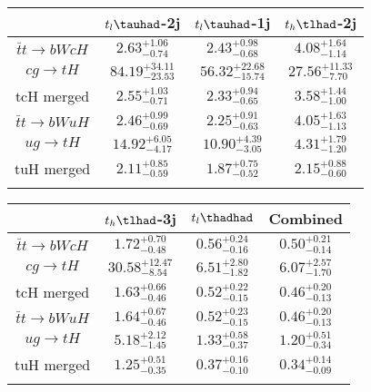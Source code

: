 \centering
\begin{tabular}{cccc} \toprule\toprule
 & $t_l\tauhad$-2j & $t_l\tauhad$-1j & $t_h\tlhad$-2j\\\midrule
$\bar{t}t\to bWcH$ & $2.63^{+1.06}_{-0.74}$ & $2.43^{+0.98}_{-0.68}$ & $4.08^{+1.64}_{-1.14}$\\
$cg\to tH$ & $84.19^{+34.11}_{-23.53}$ & $56.32^{+22.68}_{-15.74}$ & $27.56^{+11.33}_{-7.70}$\\
tcH merged & $2.55^{+1.03}_{-0.71}$ & $2.33^{+0.94}_{-0.65}$ & $3.58^{+1.44}_{-1.00}$\\
$\bar{t}t\to bWuH$ & $2.46^{+0.99}_{-0.69}$ & $2.25^{+0.91}_{-0.63}$ & $4.05^{+1.63}_{-1.13}$\\
$ug\to tH$ & $14.92^{+6.05}_{-4.17}$ & $10.90^{+4.39}_{-3.05}$ & $4.31^{+1.79}_{-1.20}$\\
tuH merged & $2.11^{+0.85}_{-0.59}$ & $1.87^{+0.75}_{-0.52}$ & $2.15^{+0.88}_{-0.60}$\\
\bottomrule\bottomrule\\
\end{tabular}
\begin{tabular}{cccc} \toprule\toprule
 & $t_h\tlhad$-3j & $t_l\thadhad$ & Combined\\\midrule
$\bar{t}t\to bWcH$ & $1.72^{+0.70}_{-0.48}$ & $0.56^{+0.24}_{-0.16}$ & $0.50^{+0.21}_{-0.14}$\\
$cg\to tH$ & $30.58^{+12.47}_{-8.54}$ & $6.51^{+2.80}_{-1.82}$ & $6.07^{+2.57}_{-1.70}$\\
tcH merged & $1.63^{+0.66}_{-0.46}$ & $0.52^{+0.22}_{-0.15}$ & $0.46^{+0.20}_{-0.13}$\\
$\bar{t}t\to bWuH$ & $1.64^{+0.67}_{-0.46}$ & $0.52^{+0.23}_{-0.15}$ & $0.46^{+0.20}_{-0.13}$\\
$ug\to tH$ & $5.18^{+2.12}_{-1.45}$ & $1.33^{+0.58}_{-0.37}$ & $1.20^{+0.51}_{-0.34}$\\
tuH merged & $1.25^{+0.51}_{-0.35}$ & $0.37^{+0.16}_{-0.10}$ & $0.34^{+0.14}_{-0.09}$\\
\bottomrule\bottomrule\\
\end{tabular}
